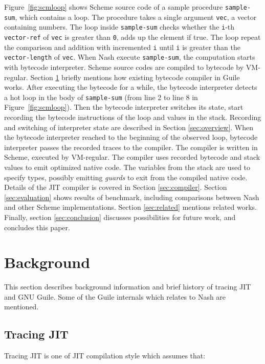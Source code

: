 \documentclass[preprint, numbers]{sigplanconf}
\begin{document}
Figure~\hyperref[fig:scmloop]{\ref{fig:scmloop}} shows Scheme source code of a
sample procedure \texttt{sample-sum}, which contains a loop. The procedure
takes a single argument \texttt{vec}, a vector containing numbers. The loop
inside \texttt{sample-sum} checks whether the \texttt{i}-th
\texttt{vector-ref} of \texttt{vec} is greater than \texttt{0}, adds up the
element if true. The loop repeat the comparison and addition with incremented
\texttt{i} until \texttt{i} is greater than the \texttt{vector-length} of
\texttt{vec}.  When Nash execute \texttt{sample-sum}, the computation starts
with bytecode interpreter. Scheme source codes are compiled to bytecode by
VM-regular. Section \hyperref[sec:background]{\ref{sec:background}} briefly
mentions how existing bytecode compiler in Guile works. After executing the
bytecode for a while, the bytecode interpreter detects a hot loop in the body
of \texttt{sample-sum} (from line 2 to line 8 in
Figure~\hyperref[fig:scmloop]{\ref{fig:scmloop}}). Then the bytecode
interpreter switches its state, start recording the bytecode instructions of
the loop and values in the stack. Recording and switching of interpreter state
are described in Section \hyperref[sec:overview]{\ref{sec:overview}}. When the
bytecode interpreter reached to the beginning of the observed loop, bytecode
interpreter passes the recorded traces to the compiler. The compiler is
written in Scheme, executed by VM-regular. The compiler uses recorded bytecode
and stack values to emit optimized native code. The variables from the stack
are used to specify types, possibly emitting \textit{guards} to exit from the
compiled native code. Details of the JIT compiler is covered in Section
\hyperref[sec:compiler]{\ref{sec:compiler}}. Section
\hyperref[sec:evaluation]{\ref{sec:evaluation}} shows results of benchmark,
including comparisons between Nash and other Scheme implementations. Section
\hyperref[sec:related]{\ref{sec:related}} mentions related works. Finally,
section \hyperref[sec:conclusion]{\ref{sec:conclusion}} discusses
possibilities for future work, and concludes this paper.

\section{Background}
\label{sec:background}

This section describes background information and brief history of tracing JIT
and GNU Guile. Some of the Guile internals which relates to Nash are
mentioned.

\subsection{Tracing JIT}
Tracing JIT is one of JIT compilation style which assumes
that\cite{bolz2009tracing}:
\end{document}
